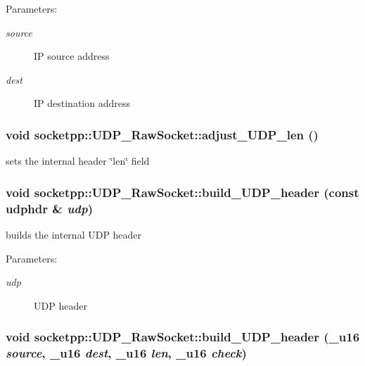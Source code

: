 \begin{Desc}
\item[Parameters:]
\begin{description}
\item[{\em source}]IP source address \item[{\em dest}]IP destination address \end{description}
\end{Desc}
\hypertarget{classsocketpp_1_1UDP__RawSocket_1caa413cfe4f72d8c0aeccdcb10469b5}{
\subsubsection[{adjust\_\-UDP\_\-len}]{\setlength{\rightskip}{0pt plus 5cm}void socketpp::UDP\_\-RawSocket::adjust\_\-UDP\_\-len ()}}
\label{classsocketpp_1_1UDP__RawSocket_1caa413cfe4f72d8c0aeccdcb10469b5}


sets the internal header \char`\"{}len\char`\"{} field 

\hypertarget{classsocketpp_1_1UDP__RawSocket_b194e3ab2f5b758dee8a0c715d895c1e}{
\subsubsection[{build\_\-UDP\_\-header}]{\setlength{\rightskip}{0pt plus 5cm}void socketpp::UDP\_\-RawSocket::build\_\-UDP\_\-header (const udphdr \& {\em udp})}}
\label{classsocketpp_1_1UDP__RawSocket_b194e3ab2f5b758dee8a0c715d895c1e}


builds the internal UDP header 

\begin{Desc}
\item[Parameters:]
\begin{description}
\item[{\em udp}]UDP header \end{description}
\end{Desc}
\hypertarget{classsocketpp_1_1UDP__RawSocket_f107901141295d21929008e281aac00f}{
\subsubsection[{build\_\-UDP\_\-header}]{\setlength{\rightskip}{0pt plus 5cm}void socketpp::UDP\_\-RawSocket::build\_\-UDP\_\-header ({\bf \_\-u16} {\em source}, \/  {\bf \_\-u16} {\em dest}, \/  {\bf \_\-u16} {\em len}, \/  {\bf \_\-u16} {\em check})}}
\label{classsocketpp_1_1UDP__RawSocket_f107901141295d21929008e281aac00f}


